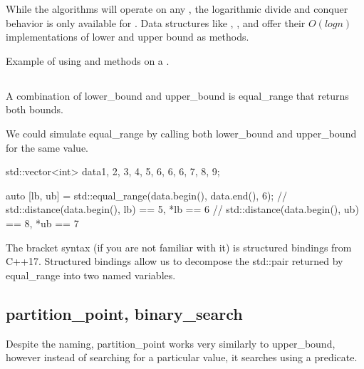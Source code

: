 While the algorithms will operate on any , the logarithmic divide and conquer behavior is only available for . Data structures like , ,  and  offer their $O(logn)$ implementations of lower and upper bound as methods.

\begin{box-note}
\footnotesize Example of using  and  methods on a .
\tcblower
{}
\end{box-note}

\subsection{\texorpdfstring{}{\texttt{std::equal\_range}}}

A combination of lower\_bound and upper\_bound is equal\_range that returns both bounds.



We could simulate equal\_range by calling both lower\_bound and upper\_bound for the same value.

\begin{box-note}
\begin{cppcode}
std::vector<int> data{1, 2, 3, 4, 5, 6, 6, 6, 7, 8, 9};

auto [lb, ub] = std::equal_range(data.begin(), data.end(), 6);
// std::distance(data.begin(), lb) == 5, *lb == 6
// std::distance(data.begin(), ub) == 8, *ub == 7
\end{cppcode}
\end{box-note}

The bracket syntax (if you are not familiar with it) is structured bindings from C++17. Structured bindings allow us to decompose the std::pair returned by equal\_range into two named variables.

\subsection{partition\_point, binary\_search}

Despite the naming, partition\_point works very similarly to upper\_bound, however instead of searching for a particular value, it searches using a predicate.

